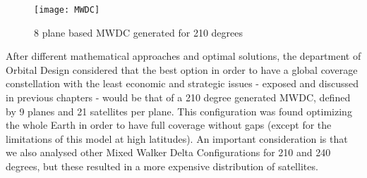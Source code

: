 \begin{figure}[h]
\texttt{[image: MWDC]}
\centering
\caption{8 plane based MWDC generated for 210 degrees}
\end{figure}

After different mathematical approaches and optimal solutions, the department of Orbital Design considered that the best option in order to have a global coverage constellation with the least economic and strategic issues - exposed and discussed in previous chapters - would be that of a 210 degree generated MWDC, defined by 9 planes and 21 satellites per plane. This configuration was found optimizing the whole Earth in order to have full coverage without gaps (except for the limitations of this model at high latitudes). An important consideration is that we also analysed other Mixed Walker Delta Configurations for 210 and 240 degrees, but these resulted in a more expensive distribution of satellites.